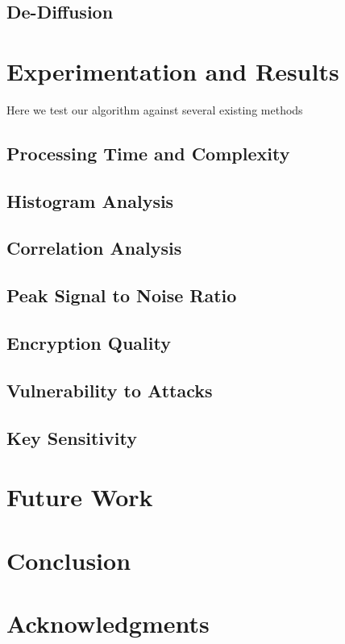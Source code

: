 \documentclass[conference]{IEEEtran}
\begin{document}
\subsection{De-Diffusion}\label{subsec:de-diffusion}

\section{Experimentation and Results}\label{sec:experimentation-and-results}

Here we test our algorithm against several existing methods

\subsection{Processing Time and Complexity}\label{subsec:processing-time-and-complexity}

\subsection{Histogram Analysis}\label{subsec:histogram-analysis}

\subsection{Correlation Analysis}\label{subsec:correlation-analysis}

\subsection{Peak Signal to Noise Ratio}\label{subsec:peak-signal-to-noise-ratio}

\subsection{Encryption Quality}\label{subsec:encryption-quality}

\subsection{Vulnerability to Attacks}\label{subsec:vulnerability-to-attacks}

\subsection{Key Sensitivity}\label{subsec:key-sensitivity}

\section{Future Work}\label{sec:future-work}

\section{Conclusion}\label{sec:conclusion}

\section{Acknowledgments}\label{sec:acknowledgments}



\end{document}
